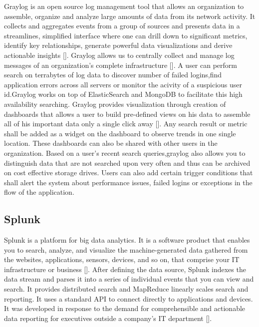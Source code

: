 Graylog is an open source log management tool that allows an
organization to assemble, organize and analyze large amounts of data
from its network activity. It collects and aggregates events from a
group of sources and presents data in a streamlines, simplified
interface where one can drill down to significant metrics, identify
key relationships, generate powerful data visualizations and derive
actionable insights [\cite{www-graylog-blog}].  Graylog allows us to
centrally collect and manage log messages of an organization's
complete infrastructure [\cite{www-graylog-optimization}]. A user can
perform search on terrabytes of log data to discover number of failed
logins,find application errors across all servers or monitor the
acivity of a suspicious user id.Graylog works on top of ElasticSearch
and MongoDB to facilitate this high availability searching.  Graylog
provides visualization through creation of dashboards that allows a
user to build pre-defined views on his data to assemble all of his
important data only a single click away
[\cite{www-graylog-dashboards}]. Any search result or metric shall be
added as a widget on the dashboard to observe trends in one single
location. These dashboards can also be shared with other users in the
organization. Based on a user's recent search queries,graylog also
allows you to distinguish data that are not searched upon very often
and thus can be archived on cost effective storage drives. Users can
also add certain trigger conditions that shall alert the system about
performance issues, failed logins or exceptions in the flow of the
application.
    
\subsection{Splunk}

Splunk is a platform for big data analytics. It is a software product
that enables you to search, analyze, and visualize the
machine-generated data gathered from the websites, applications,
sensors, devices, and so on, that comprise your IT infrastructure or
business [\cite{www-splunk}]. After defining the data source, Splunk
indexes the data stream and parses it into a series of individual
events that you can view and search. It provides distributed search
and MapReduce linearly scales search and reporting. It uses a standard
API to connect directly to applications and devices. It was developed
in response to the demand for comprehensible and actionable data
reporting for executives outside a company's IT
department [\cite{www-splunk}].
    
